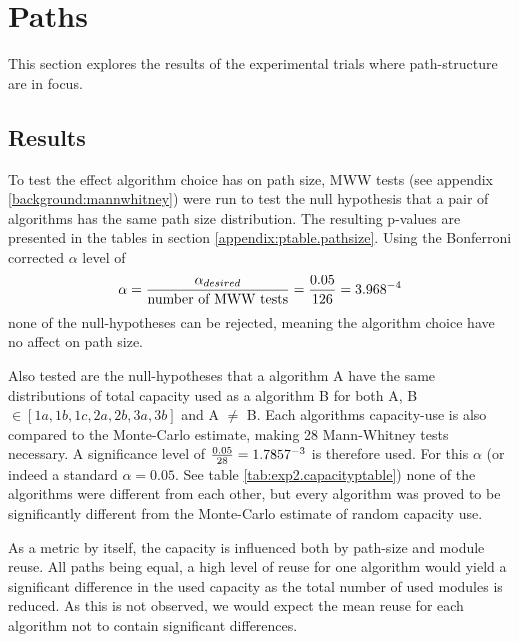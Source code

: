 \section{Paths}
This section explores the results of the experimental trials where path-structure are in focus. 

\subsection{Results}
To test the effect algorithm choice has on path size, MWW tests (see appendix \ref{background:mannwhitney}) were run to test the null hypothesis that a pair of algorithms has the same path size distribution. The resulting p-values are presented in the tables in section \ref{appendix:ptable.pathsize}. Using the Bonferroni corrected \(\alpha\) level of 
\begin{equation*}
    \alpha=\frac{\alpha_{desired}}{\text{number of MWW tests}}=\frac{0.05}{126}=3.968\time 10^{-4}
\end{equation*}
none of the null-hypotheses can be rejected, meaning the algorithm choice have no affect on path size. 

Also tested are the null-hypotheses that a algorithm A have the same distributions of total capacity used as a algorithm B for both A, B \(\in [1a, 1b, 1c, 2a, 2b, 3a, 3b]\) and A \(\neq\) B. Each algorithms capacity-use is also compared to the Monte-Carlo estimate, making 28 Mann-Whitney tests necessary. A significance level of \(\frac{0.05}{28}=1.7857\time 10^{-3}\) is therefore used. For this \(\alpha\) (or indeed a standard \(\alpha=0.05\). See table \ref{tab:exp2.capacityptable}) none of the algorithms were different from each other, but every algorithm was proved to be significantly different from the Monte-Carlo estimate of random capacity use. 

As a metric by itself, the capacity is influenced both by path-size and module reuse. All paths being equal, a high level of reuse for one algorithm would yield a significant difference in the used capacity as the total number of used modules is reduced. As this is not observed, we would expect the mean reuse for each algorithm not to contain significant differences.

